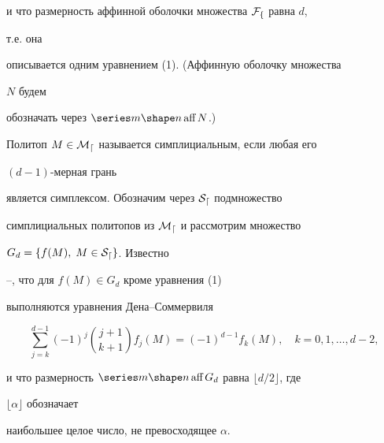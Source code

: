 и что размерность аффинной оболочки множества $\cal F_f$ равна $d$,


т.е. она


описывается одним уравнением (1). (Аффинную оболочку множества


$N$ будем


обозначать через $\aff N$.)





Политоп $M\in\cal M_d$ называется симплициальным, если любая его


$(d-1)$-мерная грань


является симплексом. Обозначим через $\cal S_d$ подмножество


симплициальных политопов из $\cal M_d$ и рассмотрим множество


$G_d=\{f(M),\;M\in\cal S_d\}$. Известно


\cite{Bre}--\cite{Gru}, что для $f(M)\in G_d$ кроме уравнения (1)


выполняются уравнения Дена--Соммервиля


\begin{equation}


\sum^{d-1}_{j=k}(-1)^j\binom{j+1}{k+1}f_j(M)=(-1)^{d-1}


f_k(M),\quad k=0,1,\dotsc,d-2,


\end{equation}


и что размерность $\aff G_d$ равна $\lfloor d/2\rfloor$, где


$\lfloor\alpha\rfloor$ обозначает


наибольшее целое число, не превосходящее $\alpha$.





